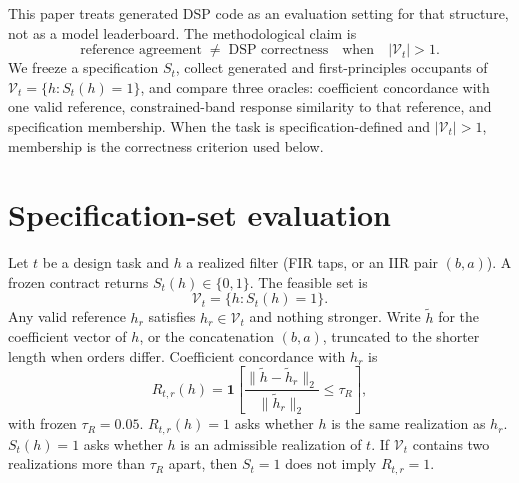 \documentclass{article}
\begin{document}
This paper treats generated DSP code as an evaluation setting for that
structure, not as a model leaderboard.
The methodological claim is
\begin{equation}
\text{reference agreement}\;\neq\;\text{DSP correctness}
\quad\text{when}\quad
\lvert\mathcal{V}_t\rvert>1.
\label{eq:claim}
\end{equation}
We freeze a specification $S_t$, collect generated and first-principles
occupants of $\mathcal{V}_t=\{h:S_t(h)=1\}$, and compare three oracles:
coefficient concordance with one valid reference, constrained-band
response similarity to that reference, and specification membership.
When the task is specification-defined and $\lvert\mathcal{V}_t\rvert>1$,
membership is the correctness criterion used below.

\section{Specification-set evaluation}
\label{sec:method}

Let $t$ be a design task and $h$ a realized filter (FIR taps, or an
IIR pair $(b,a)$).
A frozen contract returns $S_t(h)\in\{0,1\}$.
The feasible set is
\begin{equation}
\mathcal{V}_t=\{h:S_t(h)=1\}.
\label{eq:vt}
\end{equation}
Any valid reference $h_r$ satisfies $h_r\in\mathcal{V}_t$ and nothing
stronger.
Write $\tilde h$ for the coefficient vector of $h$, or the
concatenation $(b,a)$, truncated to the shorter length when orders
differ.
Coefficient concordance with $h_r$ is
\begin{equation}
R_{t,r}(h)
=\mathbf{1}\!\left[
\frac{\lVert \tilde h-\tilde h_r\rVert_2}{\lVert\tilde h_r\rVert_2}
\le\tau_R\right],
\label{eq:r}
\end{equation}
with frozen $\tau_R=0.05$.
$R_{t,r}(h)=1$ asks whether $h$ is the same realization as $h_r$.
$S_t(h)=1$ asks whether $h$ is an admissible realization of $t$.
If $\mathcal{V}_t$ contains two realizations more than $\tau_R$ apart,
then $S_t=1$ does not imply $R_{t,r}=1$.
\end{document}

